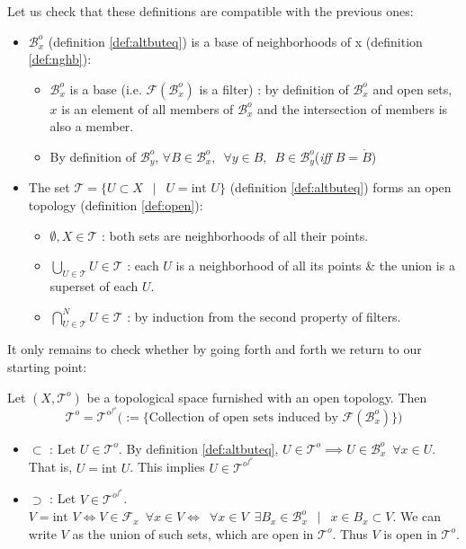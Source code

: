 Let us check that these definitions are compatible with the previous ones:
\begin{itemize}
	\item $\mathcal{B}_x^o$ (definition \ref{def:altbuteq}) is a base of neighborhoods of x (definition \ref{def:nghb}):
	\begin{itemize}
		\item $\mathcal{B}_x^o$ is a base (i.e. $\mathcal{F}( \mathcal{B}_x^o )$ is a filter) : by definition of $\mathcal{B}_x^o$ and open sets, $x$ is an element of all members of $\mathcal{B}_x^o$ and the intersection of members is also a member. \hfill \done
		\item By definition of $\mathcal{B}_y^o$, $\forall B \in \mathcal{B}_x^o, \enspace \forall y \in B, \enspace B\in \mathcal{B}_y^o$\quad (\textit{iff} $B = \mathring{B}$) \hfill \done
	\end{itemize}
	\item The set $\mathcal{T} = \{U \subset X \enspace \mid \enspace U = \textrm{int } U\}$ (definition \ref{def:altbuteq}) forms an open topology (definition \ref{def:open}):
	\begin{itemize} 
		\item $\emptyset{}, X \in \mathcal{T}$ : both sets are neighborhoods of all their points. \hfill \done
		\item $\bigcup\limits_{U\in \mathcal{T}} U \in \mathcal{T}$ : each $U$ is a neighborhood of all its points \& the union is a superset of each $U$. \hfill \done
		\item $\bigcap\limits^{N}_{U\in \mathcal{T}} U \in \mathcal{T}$ : by induction from the second property of filters. \hfill \done
	\end{itemize}
\end{itemize}
It only remains to check whether by going forth and forth we return to our starting point:
\begin{myprop}{}{}
	Let $(X, \mathcal{T}^o)$ be a topological space furnished with an open topology. Then
	$$\mathcal{T}^o = \mathcal{T}^{o^{f^o}} \big(:= \{\textrm{Collection of open sets induced by } \mathcal{F}( \mathcal{B}_x^o)\}\big)$$
\end{myprop}
\begin{myproof} 
	\begin{itemize}
		\item $\subset$ : Let $U\in \mathcal{T}^o$. By definition \ref{def:altbuteq}, $U \in \mathcal{T}^o \implies U \in \mathcal{B}_x^o \enspace \forall x \in U$. That is, $U = \textrm{int } U$. This implies $U \in \mathcal{T}^{o^{f^o}}$
		\item $\supset$ : Let $V\in \mathcal{T}^{o^{f^o}}$. $V = \textrm{int }V \iff V \in \mathcal{F}_x \enspace \forall x \in V \iff \enspace \forall x \in V \enspace \exists B_x \in \mathcal{B}_x^o \enspace \mid \enspace x \in B_x \subset V$. We can write $V$ as the union of such sets, which are open in $\mathcal{T}^o$. Thus $V$ is open in $\mathcal{T}^o$.
	\end{itemize}
\end{myproof}

